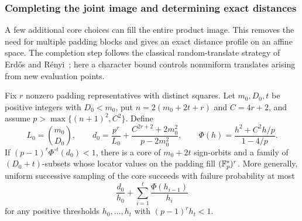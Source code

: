 \subsubsection{Completing the joint image and determining exact distances}

A few additional core choices can fill the entire product image. This
removes the need for multiple padding blocks and gives an exact distance
profile on an affine space. The completion step follows the classical
random-translate strategy of Erd\H{o}s and R\'enyi~\cite[Theorem 2]{erdos-renyi-group}; here a character bound controls
nonuniform translates arising from new evaluation points.

\begin{lemma}\label{pd:completion}
Fix $r$ nonzero padding representatives with distinct squares. Let
$m_0,D_0,t$ be positive integers with $D_0<m_0$, put
$n=2(m_0+2t+r)$ and $C=4r+2$, and assume
$p>\max\{(n+1)^2,C^2\}$. Define
\[
 L_0=\binom{m_0}{D_0},\qquad
 d_0=\frac{p^r}{L_0}+
 \frac{C^{2r+2}+2m_0^2}{p-2m_0^2},\qquad
 \Phi(h)=\frac{h^2+C^2h/p}{1-4/p}.
\]
If $(p-1)^r\Phi^{\circ t}(d_0)<1$, there is a core of $m_0+2t$
sign-orbits and a family of $(D_0+t)$-subsets whose locator values on
the padding fill $(\mathbb F_p^*)^r$.
More generally, uniform successive sampling of the core succeeds with
failure probability at most
\begin{equation}\label{pd:completion-failure}
 \frac{d_0}{h_0}+\sum_{i=1}^t\frac{\Phi(h_{i-1})}{h_i}
\end{equation}
for any positive thresholds $h_0,\ldots,h_t$ with $(p-1)^rh_t<1$.
\end{lemma}

